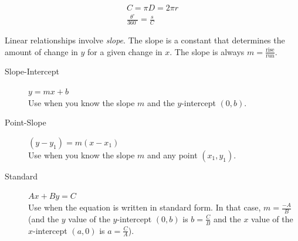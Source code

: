 \documentclass[11pt]{article}%
\begin{document}
\begin{multicols*}{2}
\newcommand\TR{3}
\begin{center}\end{center}
\begin{align*}
C = \pi D = 2 \pi r \\
\boxed{\frac{\theta^{\circ}}{360^{\circ}} = \frac{s}{C}}
\end{align*}

\divider

Linear relationships involve \textit{slope}. The slope is a constant that determines the amount of change in $y$ for a given change in $x$. The slope is always $\boxed{m = \frac{\text{rise}}{\text{run}}}$.

\begin{description}
\item[Slope-Intercept] $\boxed{y = mx + b}$ \\ Use when you know the slope $m$ and the $y$-intercept $\left( 0, b \right)$.
\item[Point-Slope] $\boxed{\left( y - y_{1} \right) = m \left( x - x_{1} \right)}$ \\ Use when you know the slope $m$ and any point $\left( x_{1}, y_{1} \right)$.
\item[Standard] $\boxed{Ax + By = C}$ \\ Use when the equation is written in standard form. In that case, $\boxed{m = \frac{-A}{B}}$ (and the $y$ value of the $y$-intercept $\left( 0, b \right)$ is $b = \frac{C}{B}$ and the $x$ value of the $x$-intercept $\left( a, 0 \right)$ is $a = \frac{C}{A}$).
\end{description}

\divider


\end{multicols*}
\end{document}
